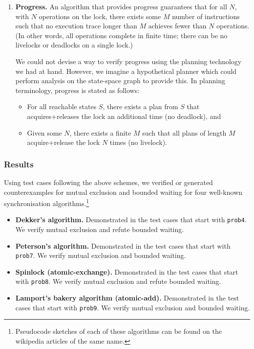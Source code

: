 \begin{enumerate}
		This setup also assumes that the lock sequence can be subdivided into the two subsequences denoted above. If there exists no such split, we say that the algorithm does not provide bounded waiting.\footnote{
		This nonexistence can be verified by enumerating all possible instructions in the lock sequence before which to put the new steps. In our test suite, we are not exhaustive about this, though it is possible.}
	\item {\bf Progress.} An algorithm that provides progress guarantees that for all $N$, with $N$ operations on the lock, there exists some $M$ number of instructions such that no execution trace longer than $M$ achieves fewer than $N$ operations. (In other words, all operations complete in finite time; there can be no livelocks or deadlocks on a single lock.)

		We could not devise a way to verify progress using the planning technology we had at hand. However, we imagine a hypothetical planner which could perform analysis on the state-space graph to provide this. In planning terminology, progress is stated as follows:
		\begin{itemize}
			\item For all reachable states $S$, there exists a plan from $S$ that acquires+releases the lock an additional time (no deadlock), and
			\item Given some $N$, there exists a finite $M$ such that all plans of length $M$ acquire+release the lock $N$ times (no livelock).
		\end{itemize}
\end{enumerate}

\subsubsection{Results}

Using test cases following the above schemes, we verified or generated counterexamples for mutual exclusion and bounded waiting for four well-known synchronisation algorithms.\footnote{
Pseudocode sketches of each of these algorithms can be found on the wikipedia articles of the same name.}

\begin{itemize}
	\item {\bf Dekker's algorithm.} Demonstrated in the test cases that start with \texttt{prob4}. We verify mutual exclusion and refute bounded waiting.
	\item {\bf Peterson's algorithm.} Demonstrated in the test cases that start with \texttt{prob7}. We verify mutual exclusion and bounded waiting.
	\item {\bf Spinlock (atomic-exchange).} Demonstrated in the test cases that start with \texttt{prob8}. We verify mutual exclusion and refute bounded waiting.
	\item {\bf Lamport's bakery algorithm (atomic-add).} Demonstrated in the test cases that start with \texttt{prob9}. We verify mutual exclusion and bounded waiting.
\end{itemize}


